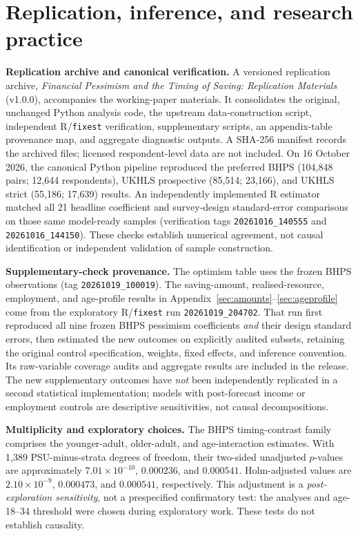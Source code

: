 \clearpage
\section{Replication, inference, and research practice}\label{sec:replication}

\textbf{Replication archive and canonical verification.} A versioned replication archive, \emph{Financial Pessimism and the Timing of Saving: Replication Materials} (v1.0.0), accompanies the working-paper materials. It consolidates the original, unchanged Python analysis code, the upstream data-construction script, independent R/\texttt{fixest} verification, supplementary scripts, an appendix-table provenance map, and aggregate diagnostic outputs. A SHA-256 manifest records the archived files; licensed respondent-level data are not included. On 16 October 2026, the canonical Python pipeline reproduced the preferred BHPS (104,848 pairs; 12,644 respondents), UKHLS prospective (85,514; 23,166), and UKHLS strict (55,186; 17,639) results. An independently implemented R estimator matched all 21 headline coefficient and survey-design standard-error comparisons on those same model-ready samples (verification tags \texttt{20261016\_140555} and \texttt{20261016\_144150}). These checks establish numerical agreement, not causal identification or independent validation of sample construction.

\textbf{Supplementary-check provenance.} The optimism table uses the frozen BHPS observations (tag \texttt{20261019\_100019}). The saving-amount, realised-resource, employment, and age-profile results in Appendix~\ref{sec:amounts}--\ref{sec:ageprofile} come from the exploratory R/\texttt{fixest} run \texttt{20261019\_204702}. That run first reproduced all nine frozen BHPS pessimism coefficients \emph{and} their design standard errors, then estimated the new outcomes on explicitly audited subsets, retaining the original control specification, weights, fixed effects, and inference convention. Its raw-variable coverage audits and aggregate results are included in the release. The new supplementary outcomes have \emph{not} been independently replicated in a second statistical implementation; models with post-forecast income or employment controls are descriptive sensitivities, not causal decompositions.\par\medskip

\textbf{Multiplicity and exploratory choices.} The BHPS timing-contrast family comprises the younger-adult, older-adult, and age-interaction estimates. With 1,389 PSU-minus-strata degrees of freedom, their two-sided unadjusted $p$-values are approximately $7.01\times10^{-10}$, $0.000236$, and $0.000541$. Holm-adjusted values are $2.10\times10^{-9}$, $0.000473$, and $0.000541$, respectively. This adjustment is a \emph{post-exploration sensitivity}, not a prespecified confirmatory test: the analyses and age-18--34 threshold were chosen during exploratory work. These tests do not establish causality.

